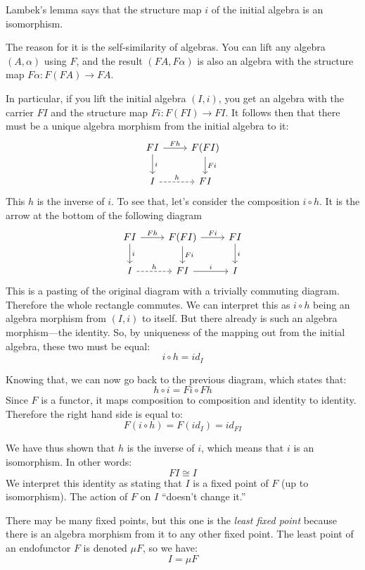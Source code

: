 \documentclass[DaoFP]{subfiles}
\begin{document}
Lambek's lemma says that the structure map $i$ of the initial algebra is an isomorphism. 

The reason for it is the self-similarity of algebras. You can lift any algebra $(A, \alpha)$ using $F$, and the result $(F A, F \alpha)$ is also an algebra with the structure map $F \alpha \colon F (F A) \to F A$. 

In particular, if you lift the initial algebra $(I, i)$, you get an algebra with the carrier $F I$ and the structure map $F i \colon F (F I) \to F I$. It follows then that there must be a unique algebra morphism from the initial algebra to it:
\[
 \begin{tikzcd}
 F I 
 \arrow[r, "F h"]
 \arrow[d, "i"]
 & F (F I)
\arrow[d, "F i"]
 \\
 I
 \arrow[r, dashed, "h"]
 & F I
  \end{tikzcd}
\]
This $h$ is the inverse of $i$. To see that, let's consider the composition $i \circ h$. It is the arrow at the bottom of the following diagram
\[
 \begin{tikzcd}
 F I 
 \arrow[r, "F h"]
 \arrow[d, "i"]
 & F (F I)
\arrow[d, "F i"]
\arrow[r, "F i"]
& F I
\arrow[d, "i"]
 \\
 I
 \arrow[r, dashed, "h"]
 & F I
 \arrow[r, "i"]
 & I
  \end{tikzcd}
\]
This is a pasting of the original diagram with a trivially commuting diagram. Therefore the whole rectangle commutes. We can interpret this as $i \circ h$ being an algebra morphism from $(I, i)$ to itself. But there already is such an algebra morphism---the identity. So, by uniqueness of the mapping out from the initial algebra, these two must be equal:
\[ i \circ h = id_I \] 

Knowing that, we can now go back to the previous diagram, which states that:
\[ h \circ i = F i \circ F h \]
Since $F$ is a functor, it maps composition to composition and identity to identity. Therefore the right hand side is equal to:
\[ F (i \circ h) = F (id_I) = id_{F I} \]

We have thus shown that $h$ is the inverse of $i$, which means that $i$ is an isomorphism. In other words:
\[ F I \cong I \]
We interpret this identity as stating that $I$ is a fixed point of $F$ (up to isomorphism). The action of $F$ on $I$ ``doesn't change it.''

There may be many fixed points, but this one is the \emph{least fixed point} because there is an algebra morphism from it to any other fixed point. The least point of an endofunctor $F$ is denoted $\mu F$, so we have:
\[ I = \mu F \]
\end{document}

